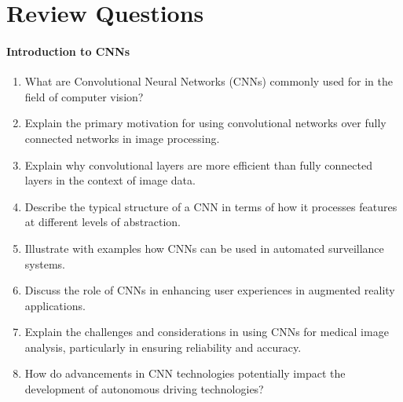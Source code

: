 
\section{Review Questions}
\paragraph*{Introduction to CNNs}
\begin{enumerate}[nosep]
    \item What are Convolutional Neural Networks (CNNs) commonly used for in the field of computer vision?
    \item Explain the primary motivation for using convolutional networks over fully connected networks in image processing.
    \item Explain why convolutional layers are more efficient than fully connected layers in the context of image data.
    \item Describe the typical structure of a CNN in terms of how it processes features at different levels of abstraction.
    \item Illustrate with examples how CNNs can be used in automated surveillance systems.
    \item Discuss the role of CNNs in enhancing user experiences in augmented reality applications.
    \item Explain the challenges and considerations in using CNNs for medical image analysis, particularly in ensuring reliability and accuracy.
    \item How do advancements in CNN technologies potentially impact the development of autonomous driving technologies?
\end{enumerate}
